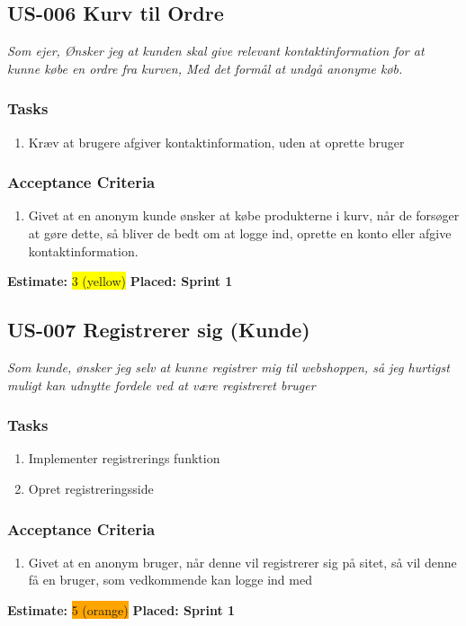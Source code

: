 \subsection{US-006 Kurv til Ordre}
\label{sec:US-006}
\textit{Som ejer, Ønsker jeg at kunden skal give relevant kontaktinformation for at kunne købe en ordre fra kurven, Med det formål at undgå anonyme køb.}
\subsubsection*{\textbf{Tasks}}
\begin{enumerate}
  \item Kræv at brugere afgiver kontaktinformation, uden at oprette bruger
\end{enumerate}
\subsubsection*{\textbf{Acceptance Criteria}}
\begin{enumerate}
  \item Givet at en anonym kunde ønsker at købe produkterne i kurv, når de forsøger at gøre dette, så bliver de bedt om at logge ind, oprette en konto eller afgive kontaktinformation.
\end{enumerate}
\textbf{Estimate:} \colorbox{yellow}{3 (yellow)}
\textbf{Placed: Sprint 1}
\par\noindent\dotfill

\subsection{US-007 Registrerer sig (Kunde)}
\label{sec:US-007}
\textit{Som kunde, ønsker jeg selv at kunne registrer mig til webshoppen, så jeg hurtigst muligt kan udnytte fordele ved at være registreret bruger}
\subsubsection*{\textbf{Tasks}}
\begin{enumerate}
  \item Implementer registrerings funktion
  \item Opret registreringsside
\end{enumerate}
\subsubsection*{\textbf{Acceptance Criteria}}
\begin{enumerate}
  \item Givet at en anonym bruger, når denne vil registrerer sig på sitet, så vil denne få en bruger, som vedkommende kan logge ind med
\end{enumerate}
\textbf{Estimate:} \colorbox{orange}{5 (orange)}
\textbf{Placed: Sprint 1}
\par\noindent\dotfill

